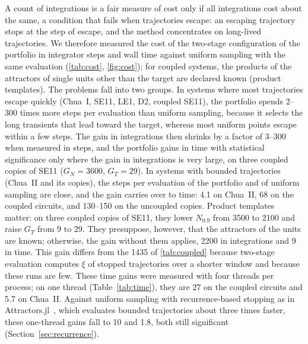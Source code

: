 A count of integrations is a fair measure of cost only if all integrations cost about the same, a condition that fails when trajectories escape: an escaping trajectory stops at the step of escape, and the method concentrates on long-lived trajectories. We therefore measured the cost of the two-stage configuration of the portfolio in integrator steps and wall time against uniform sampling with the same evaluation (\cref{tab:cost}, \cref{fig:cost}); for coupled systems, the products of the attractors of single units other than the target are declared known (product templates). The problems fall into two groups. In systems where most trajectories escape quickly (Chua~I, SE11, LE1, D2, coupled SE11), the portfolio spends 2--300 times more steps per evaluation than uniform sampling, because it selects the long transients that lead toward the target, whereas most uniform points escape within a few steps. The gain in integrations then shrinks by a factor of 3--300 when measured in steps, and the portfolio gains in time with statistical significance only where the gain in integrations is very large, on three coupled copies of SE11 ($G_N=3600$, $G_T=29$). In systems with bounded trajectories (Chua~II and its copies), the steps per evaluation of the portfolio and of uniform sampling are close, and the gain carries over to time: 4.1 on Chua~II, 68 on the coupled circuits, and 130--150 on the uncoupled copies. Product templates matter: on three coupled copies of SE11, they lower $N_{0.9}$ from 3500 to 2100 and raise $G_T$ from 9 to 29. They presuppose, however, that the attractors of the units are known; otherwise, the gain without them applies, 2200 in integrations and 9 in time. This gain differs from the 1435 of \cref{tab:coupled} because two-stage evaluation computes $\xi$ of stopped trajectories over a shorter window and because these runs are few. These time gains were measured with four threads per process; on one thread (Table~\ref{tab:time}), they are 27 on the coupled circuits and 5.7 on Chua~II. Against uniform sampling with recurrence-based stopping as in Attractors.jl~\cite{DatserisWagemakers2022,Datseris2023Framework}, which evaluates bounded trajectories about three times faster, these one-thread gains fall to 10 and 1.8, both still significant (Section~\ref{sec:recurrence}).

